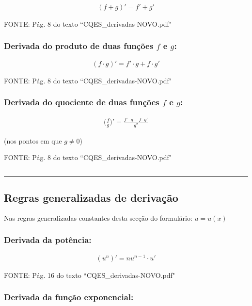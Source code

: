 \documentclass[portuguese,a4paper,12pt,onecolumn,fleqn]{article}
\newcommand{\myline}{\par
  \kern3pt %
  \hrule height 1.5pt
  \kern2pt %
  \hrule height 0.8pt
  \kern3pt %
}
\begin{document}
\begin{gather*}
(f + g)' = f' + g'
\end{gather*}

FONTE: Pág. 8 do texto ``CQES\_derivadas-NOVO.pdf"


\subsubsection*{Derivada do produto de duas funções $f$ e $g$:}

\begin{gather*}
(f \cdot g)' = f' \cdot g + f \cdot g'
\end{gather*}

FONTE: Pág. 8 do texto ``CQES\_derivadas-NOVO.pdf"


\subsubsection*{Derivada do quociente de duas funções $f$ e $g$:}

\begin{gather*}
\biggl(\frac{f}{g}\biggr)' = \frac{f' \cdot g - f \cdot g'}{g^2}
\end{gather*}

(nos pontos em que $g \ne 0$)

FONTE: Pág. 8 do texto ``CQES\_derivadas-NOVO.pdf"


\myline	%


\subsection*{Regras generalizadas de derivação}

Nas regras generalizadas constantes desta secção do formulário: $u = u(x)$

\subsubsection*{Derivada da potência:}

\begin{gather*}
(u^n)' = n u^{n-1} \cdot u'
\end{gather*}

FONTE: Pág. 16 do texto ``CQES\_derivadas-NOVO.pdf"


\subsubsection*{Derivada da função exponencial:}
\end{document}
